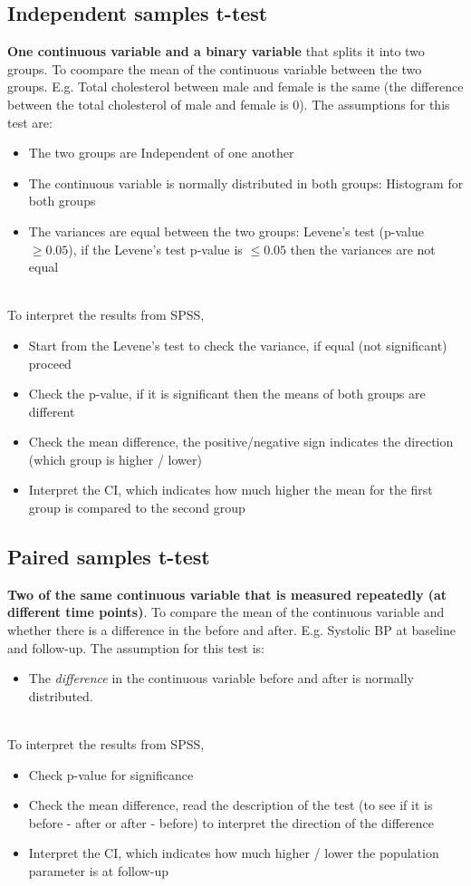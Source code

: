 \documentclass{article}
\begin{document}
\subsection{Independent samples t-test}
\textbf{One continuous variable and a binary variable} that splits it into two groups. To coompare the mean of the continuous variable between the two groups. E.g. Total cholesterol between male and female is the same (the difference between the total cholesterol of male and female is 0). The assumptions for this test are:
\begin{itemize}
    \item The two groups are Independent of one another
    \item The continuous variable is normally distributed in both groups: Histogram for both groups
    \item The variances are equal between the two groups: Levene's test (p-value $\geq 0.05$), if the Levene's test p-value is $\le 0.05$ then the variances are not equal
\end{itemize}
\mbox{}\\
To interpret the results from SPSS,
\begin{itemize}
    \item Start from the Levene's test to check the variance, if equal (not significant) proceed
    \item Check the p-value, if it is significant then the means of both groups are different
    \item Check the mean difference, the positive/negative sign indicates the direction (which group is higher / lower)
    \item Interpret the CI, which indicates how much higher the mean for the first group is compared to the second group
\end{itemize}

\subsection{Paired samples t-test}
\textbf{Two of the same continuous variable that is measured repeatedly (at different time points)}. To compare the mean of the continuous variable and whether there is a difference in the before and after. E.g. Systolic BP at baseline and follow-up. The assumption for this test is:
\begin{itemize}
    \item The \textit{difference} in the continuous variable before and after is normally distributed.
\end{itemize}
\mbox{}\\
To interpret the results from SPSS,
\begin{itemize}
    \item Check p-value for significance
    \item Check the mean difference, read the description of the test (to see if it is before - after or after - before) to interpret the direction of the difference
    \item Interpret the CI, which indicates how much higher / lower the population parameter is at follow-up
\end{itemize}
\end{document}
